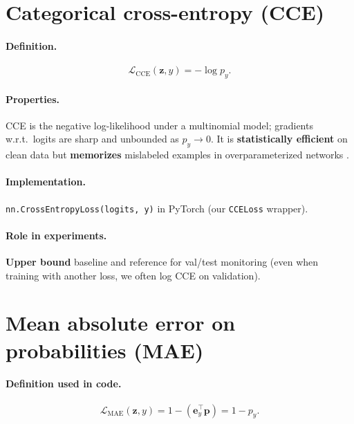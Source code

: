 \documentclass[11pt,a4paper]{article}
\begin{document}
\section{Categorical cross-entropy (CCE)}

\paragraph{Definition.}
\begin{equation}
  \mathcal{L}_{\mathrm{CCE}}(\mathbf{z}, y) = -\log p_y .
\end{equation}

\paragraph{Properties.}
CCE is the negative log-likelihood under a multinomial model; gradients w.r.t.\ logits are sharp and unbounded as $p_y \to 0$. It is \textbf{statistically efficient} on clean data but \textbf{memorizes} mislabeled examples in overparameterized networks \cite{zhang2018gce}.

\paragraph{Implementation.}
\texttt{nn.CrossEntropyLoss(logits, y)} in PyTorch (our \texttt{CCELoss} wrapper).

\paragraph{Role in experiments.}
\textbf{Upper bound} baseline and reference for val/test monitoring (even when training with another loss, we often log CCE on validation).

\section{Mean absolute error on probabilities (MAE)}

\paragraph{Definition used in code.}
\begin{equation}
  \mathcal{L}_{\mathrm{MAE}}(\mathbf{z}, y) = 1 - (\mathbf{e}_y^\top \mathbf{p}) = 1 - p_y .
\end{equation}
\end{document}
